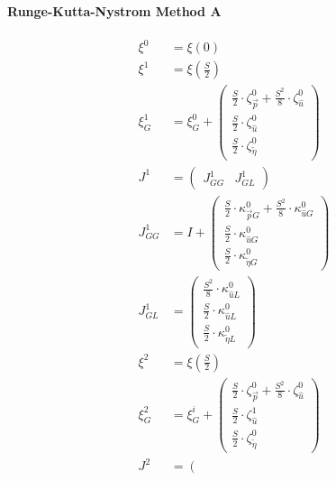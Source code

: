 \documentclass[review]{elsarticle}
\begin{document}
\paragraph{Runge-Kutta-Nystrom Method A}
\begin{equation} \begin{alignedat}{-1}
    \xi^{0}&=\xi\left(0\right) \\
    \xi^{1}&=\xi\left(\frac{S}{2}\right) \\
    \xi_{G}^{1}&=\xi_{G}^{0}+\left(\begin{array}{l}
        \frac{S}{2}\cdot\zeta_{\vec{p}}^{0}+\frac{S^{2}}{8}\cdot\zeta_{\hat{u}}^{0}\\
        \frac{S}{2}\cdot\zeta_{\hat{u}}^{0}\\
        \frac{S}{2}\cdot\zeta_{\tilde{\eta}}^{0}
    \end{array}\right) \\
    J^{1}&=\left(\begin{array}{cc}
        J_{GG}^{1} & J_{GL}^{1}
    \end{array}\right) \\
    J_{GG}^{1}&=I+\left(\begin{array}{l}
        \frac{S}{2}\cdot\kappa_{\vec{p}G}^{0}+\frac{S^{2}}{8}\cdot\kappa_{\hat{u}G}^{0}\\
        \frac{S}{2}\cdot\kappa_{\hat{u}G}^{0}\\
        \frac{S}{2}\cdot\kappa_{\tilde{\eta}G}^{0}
    \end{array}\right) \\
    J_{GL}^{1}&=\left(\begin{array}{l}
        \frac{S^{2}}{8}\cdot\kappa_{\hat{u}L}^{0}\\
        \frac{S}{2}\cdot\kappa_{\hat{u}L}^{0}\\
        \frac{S}{2}\cdot\kappa_{\tilde{\eta}L}^{0}
    \end{array}\right) \\
    \xi^{2}&=\xi\left(\frac{S}{2}\right) \\
    \xi_{G}^{2}&=\xi_{G}^{i}+\left(\begin{array}{l}
        \frac{S}{2}\cdot\zeta_{\vec{p}}^{0}+\frac{S^{2}}{8}\cdot\zeta_{\hat{u}}^{0}\\
        \frac{S}{2}\cdot\zeta_{\hat{u}}^{1}\\
        \frac{S}{2}\cdot\zeta_{\tilde{\eta}}^{0}
    \end{array}\right) \\
    J^{2}&=\left(\begin{array}{cc}

\end{array}
\end{alignedat}
\end{equation}
\end{document}
